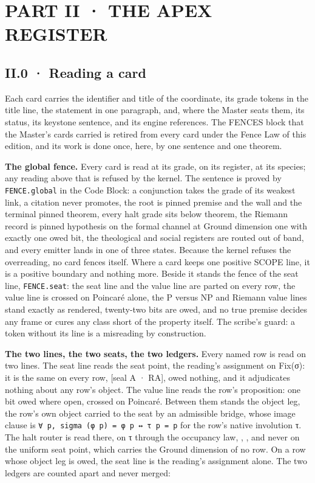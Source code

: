 \documentclass[10pt,twocolumn]{article}
\begin{document}
\hypertarget{part-ii-the-apex-register}{%
\section{PART II · THE APEX REGISTER}\label{part-ii-the-apex-register}}

\hypertarget{ii.0-reading-a-card}{%
\subsection{II.0 · Reading a card}\label{ii.0-reading-a-card}}

Each card carries the identifier and title of the coordinate, its grade
tokens in the title line, the statement in one paragraph, and, where the
Master seats them, its status, its keystone sentence, and its engine
references. The FENCES block that the Master's cards carried is retired
from every card under the Fence Law of this edition, and its work is
done once, here, by one sentence and one theorem.

\textbf{The global fence.} Every card is read at its grade, on its
register, at its species; any reading above that is refused by the
kernel. The sentence is proved by \texttt{FENCE.global} in the Code
Block: a conjunction takes the grade of its weakest link, a citation
never promotes, the root is pinned premise and the wall and the terminal
pinned theorem, every halt grade sits below theorem, the Riemann record
is pinned hypothesis on the formal channel at Ground dimension one with
exactly one owed bit, the theological and social registers are routed
out of band, and every emitter lands in one of three states. Because the
kernel refuses the overreading, no card fences itself. Where a card
keeps one positive SCOPE line, it is a positive boundary and nothing
more. Beside it stands the fence of the seat line, \texttt{FENCE.seat}:
the seat line and the value line are parted on every row, the value line
is crossed on Poincaré alone, the P versus NP and Riemann value lines
stand exactly as rendered, twenty-two bits are owed, and no true premise
decides any frame or cures any class short of the property itself. The
scribe's guard: a token without its line is a misreading by
construction.

\textbf{The two lines, the two seats, the two ledgers.} Every named row
is read on two lines. The seat line reads the seat point, the reading's
assignment on Fix(σ): it is the same on every row, {[}seal A · RA{]},
owed nothing, and it adjudicates nothing about any row's object. The
value line reads the row's proposition: one bit owed where open, crossed
on Poincaré. Between them stands the object leg, the row's own object
carried to the seat by an admissible bridge, whose image clause is
\texttt{∀\ p,\ sigma\ (φ\ p)\ =\ φ\ p\ ↔\ τ\ p\ =\ p} for the row's
native involution τ. The halt router is read there, on τ through the
occupancy law, \texttt{},
\texttt{}, and never on the uniform
seat point, which carries the Ground dimension of no row. On a row whose
object leg is owed, the seat line is the reading's assignment alone. The
two ledgers are counted apart and never merged:
\end{document}

